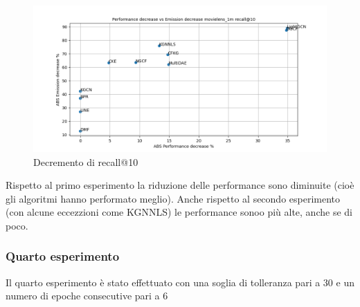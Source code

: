 \begin{figure}[H]
    \centering
    \includegraphics[scale=0.5]{images/decrement_recall@10_movielens_1m_40_6.png}
    \caption{Decremento di recall@10}
\end{figure}

\noindent Rispetto al primo esperimento la riduzione delle performance sono diminuite (cioè gli algoritmi hanno performato meglio). Anche rispetto al secondo esperimento (con alcune eccezzioni come KGNNLS) le performance sonoo più alte, anche se di poco.




\subsubsection{Quarto esperimento}
Il quarto esperimento è stato effettuato con una soglia di tolleranza pari a 30 e un numero di epoche consecutive pari a 6



